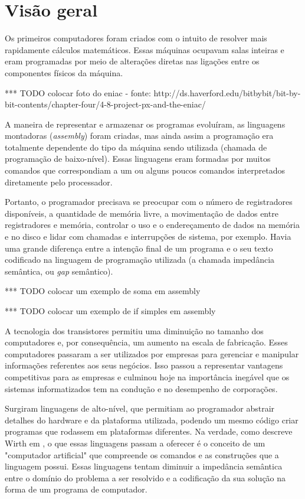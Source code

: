 \documentclass[11pt,twoside,a4paper]{book}
\begin{document}
\section{Visão geral}
\label{sec:visao_geral}
Os primeiros computadores foram criados com o intuito de resolver mais rapidamente cálculos matemáticos. Essas máquinas ocupavam salas inteiras e eram programadas por meio de alterações diretas nas ligações entre os componentes físicos da máquina. 

*** TODO colocar foto do eniac - fonte: http://ds.haverford.edu/bitbybit/bit-by-bit-contents/chapter-four/4-8-project-px-and-the-eniac/

A maneira de representar e armazenar os programas evoluíram, as linguagens montadoras (\emph{assembly}) foram criadas, mas ainda assim a programação era totalmente dependente do tipo da máquina sendo utilizada (chamada de programação de baixo-nível). Essas linguagens eram formadas por muitos comandos que correspondiam a um ou alguns poucos comandos interpretados diretamente pelo processador. 

Portanto, o programador precisava se preocupar com o número de registradores disponíveis, a quantidade de memória livre, a movimentação de dados entre registradores e memória, controlar o uso e o endereçamento de dados na memória e no disco e lidar com chamadas e interrupções de sistema, por exemplo. Havia uma grande diferença entre a intenção final de um programa e o seu texto codificado na linguagem de programação utilizada (a chamada impedância semântica, ou \emph{gap} semântico).

*** TODO colocar um exemplo de soma em assembly

*** TODO colocar um exemplo de if simples em assembly

A tecnologia dos transistores permitiu uma diminuição no tamanho dos computadores e, por consequência, um aumento na escala de fabricação. Esses computadores passaram a ser utilizados por empresas para gerenciar e manipular informações referentes aos seus negócios. Isso passou a representar vantagens competitivas para as empresas e culminou hoje na importância inegável que os sistemas informatizados tem na condução e no desempenho de corporações.

Surgiram linguagens de alto-nível, que permitiam ao programador abstrair detalhes do hardware e da plataforma utilizada, podendo um mesmo código criar programas que rodassem em plataformas diferentes. Na verdade, como descreve Wirth em \cite{alg_ds}, o que essas linguagens passam a oferecer é o conceito de um "computador artificial" que compreende os comandos e as construções que a linguagem possui. Essas linguagens tentam diminuir a impedância semântica entre o domínio do problema a ser resolvido e a codificação da sua solução na forma de um programa de computador.
\end{document}
